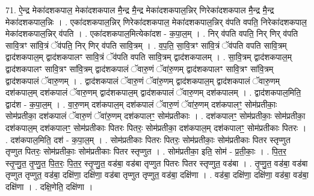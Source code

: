 \documentclass[17pt]{extarticle}
\begin{document}
71. ऐ॒न्द्र मेका॑दशकपाल॒ मेका॑दशकपाल मै॒न्द्र मै॒न्द्र मेका॑दशकपाल॒न्निर् णिरेका॑दशकपाल मै॒न्द्र मै॒न्द्र मेका॑दशकपाल॒न्निः । . एका॑दशकपाल॒न्निर् णिरेका॑दशकपाल॒ मेका॑दशकपाल॒न्निर् व॑पति वपति॒ निरेका॑दशकपाल॒ मेका॑दशकपाल॒न्निर् व॑पति । . एका॑दशकपाल॒मित्येका॑दश - क॒पा॒ल॒म् । . निर् व॑पति वपति॒ निर् णिर् व॑पति सावि॒त्रꣳ सा॑वि॒त्रं ॅव॑पति॒ निर् णिर् व॑पति सावि॒त्रम् । . व॒प॒ति॒ सा॒वि॒त्रꣳ सा॑वि॒त्रं ॅव॑पति वपति सावि॒त्रम् द्वाद॑शकपाल॒म् द्वाद॑शकपालꣳ सावि॒त्रं ॅव॑पति वपति सावि॒त्रम् द्वाद॑शकपालम् । . सा॒वि॒त्रम् द्वाद॑शकपाल॒म् द्वाद॑शकपालꣳ सावि॒त्रꣳ सा॑वि॒त्रम् द्वाद॑शकपालं ॅवारु॒णं ॅवा॑रु॒णम् द्वाद॑शकपालꣳ सावि॒त्रꣳ सा॑वि॒त्रम् द्वाद॑शकपालं ॅवारु॒णम् । . द्वाद॑शकपालं ॅवारु॒णं ॅवा॑रु॒णम् द्वाद॑शकपाल॒म् द्वाद॑शकपालं ॅवारु॒णम् दश॑कपाल॒म् दश॑कपालं ॅवारु॒णम् द्वाद॑शकपाल॒म् द्वाद॑शकपालं ॅवारु॒णम् दश॑कपालम् । . द्वाद॑शकपाल॒मिति॒ द्वाद॑श - क॒पा॒ल॒म् । . वा॒रु॒णम् दश॑कपाल॒म् दश॑कपालं ॅवारु॒णं ॅवा॑रु॒णम् दश॑कपालꣳ॒॒ सोम॑प्रतीकाः॒ सोम॑प्रतीका॒ दश॑कपालं ॅवारु॒णं ॅवा॑रु॒णम् दश॑कपालꣳ॒॒ सोम॑प्रतीकाः । . दश॑कपालꣳ॒॒ सोम॑प्रतीकाः॒ सोम॑प्रतीका॒ दश॑कपाल॒म् दश॑कपालꣳ॒॒ सोम॑प्रतीकाः पितरः पितरः॒ सोम॑प्रतीका॒ दश॑कपाल॒म् दश॑कपालꣳ॒॒ सोम॑प्रतीकाः पितरः । . दश॑कपाल॒मिति॒ दश॑ - क॒पा॒ल॒म् । . सोम॑प्रतीकाः पितरः पितरः॒ सोम॑प्रतीकाः॒ सोम॑प्रतीकाः पितर स्तृप्णुत तृप्णुत पितरः॒ सोम॑प्रतीकाः॒ सोम॑प्रतीकाः पितर स्तृप्णुत । . सोम॑प्रतीका॒ इति॒ सोम॑ - प्र॒ती॒काः॒ । . पि॒त॒र॒ स्तृ॒प्णु॒त॒ तृ॒प्णु॒त॒ पि॒त॒रः॒ पि॒त॒र॒ स्तृ॒प्णु॒त॒ वड॑बा॒ वड॑बा तृप्णुत पितरः पितर स्तृप्णुत॒ वड॑बा । . तृ॒प्णु॒त॒ वड॑बा॒ वड॑बा तृप्णुत तृप्णुत॒ वड॑बा॒ दक्षि॑णा॒ दक्षि॑णा॒ वड॑बा तृप्णुत तृप्णुत॒ वड॑बा॒ दक्षि॑णा । . वड॑बा॒ दक्षि॑णा॒ दक्षि॑णा॒ वड॑बा॒ वड॑बा॒ दक्षि॑णा । . दक्षि॒णेति॒ दक्षि॑णा । \newline
\pagebreak
{}
\end{document}
